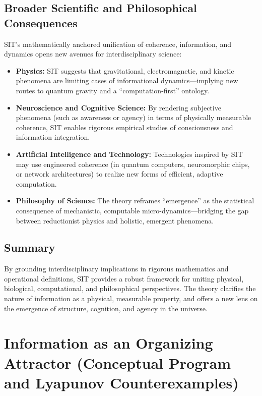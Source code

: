 \documentclass[american,11pt,letterpaper]{article}
\begin{document}
\subsection{Broader Scientific and Philosophical Consequences}

SIT's mathematically anchored unification of coherence, information, and dynamics opens new avenues for interdisciplinary science:

\begin{itemize}
    \item \textbf{Physics:}  
    SIT suggests that gravitational, electromagnetic, and kinetic phenomena are limiting cases of informational dynamics---implying new routes to quantum gravity and a ``computation-first'' ontology.
    \item \textbf{Neuroscience and Cognitive Science:}  
    By rendering subjective phenomena (such as awareness or agency) in terms of physically measurable coherence, SIT enables rigorous empirical studies of consciousness and information integration.
    \item \textbf{Artificial Intelligence and Technology:}  
    Technologies inspired by SIT may use engineered coherence (in quantum computers, neuromorphic chips, or network architectures) to realize new forms of efficient, adaptive computation.
    \item \textbf{Philosophy of Science:}  
    The theory reframes ``emergence'' as the statistical consequence of mechanistic, computable micro-dynamics---bridging the gap between reductionist physics and holistic, emergent phenomena.
\end{itemize}

\subsection{Summary}

By grounding interdisciplinary implications in rigorous mathematics and operational definitions, SIT provides a robust framework for uniting physical, biological, computational, and philosophical perspectives. The theory clarifies the nature of information as a physical, measurable property, and offers a new lens on the emergence of structure, cognition, and agency in the universe.

\section{Information as an Organizing Attractor (Conceptual Program and Lyapunov Counterexamples)}
\end{document}
